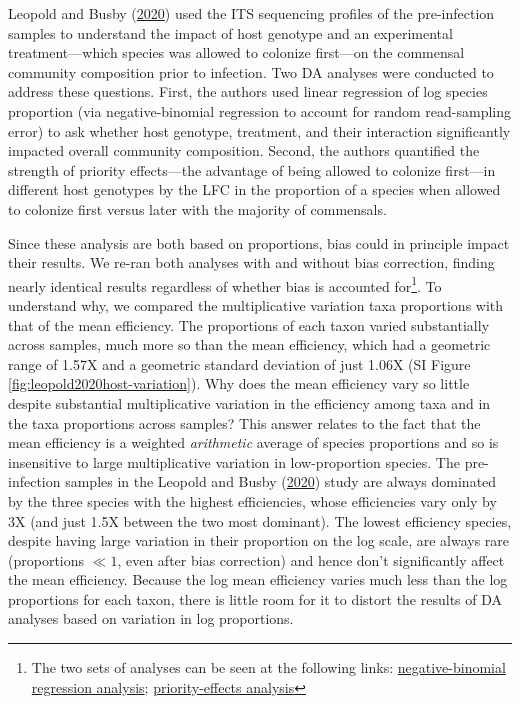 \documentclass[
]{article}
\begin{document}
Leopold and Busby (\protect\hyperlink{ref-leopold2020host}{2020}) used the ITS sequencing profiles of the pre-infection samples to understand the impact of host genotype and an experimental treatment---which species was allowed to colonize first---on the commensal community composition prior to infection.
Two DA analyses were conducted to address these questions.
First, the authors used linear regression of log species proportion (via negative-binomial regression to account for random read-sampling error) to ask whether host genotype, treatment, and their interaction significantly impacted overall community composition.
Second, the authors quantified the strength of priority effects---the advantage of being allowed to colonize first---in different host genotypes by the LFC in the proportion of a species when allowed to colonize first versus later with the majority of commensals.

Since these analysis are both based on proportions, bias could in principle impact their results.
We re-ran both analyses with and without bias correction, finding nearly identical results regardless of whether bias is accounted for\footnote{The two sets of analyses can be seen at the following links: \href{https://mikemc.github.io/differential-abundance-theory/notebook/posts/2022-01-06-leopold2020host-original-regression-analysis/index.html}{negative-binomial regression analysis}; \href{https://mikemc.github.io/differential-abundance-theory/notebook/posts/2022-01-05-leopold2020host-priority-effects/index.html}{priority-effects analysis}}.
To understand why, we compared the multiplicative variation taxa proportions with that of the mean efficiency.
The proportions of each taxon varied substantially across samples, much more so than the mean efficiency, which had a geometric range of 1.57X and a geometric standard deviation of just 1.06X (SI Figure \ref{fig:leopold2020host-variation}).
Why does the mean efficiency vary so little despite substantial multiplicative variation in the efficiency among taxa and in the taxa proportions across samples?
This answer relates to the fact that the mean efficiency is a weighted \emph{arithmetic} average of species proportions and so is insensitive to large multiplicative variation in low-proportion species.
The pre-infection samples in the Leopold and Busby (\protect\hyperlink{ref-leopold2020host}{2020}) study are always dominated by the three species with the highest efficiencies, whose efficiencies vary only by 3X (and just 1.5X between the two most dominant).
The lowest efficiency species, despite having large variation in their proportion on the log scale, are always rare (proportions \(\ll 1\), even after bias correction) and hence don't significantly affect the mean efficiency.
Because the log mean efficiency varies much less than the log proportions for each taxon, there is little room for it to distort the results of DA analyses based on variation in log proportions.
\end{document}
